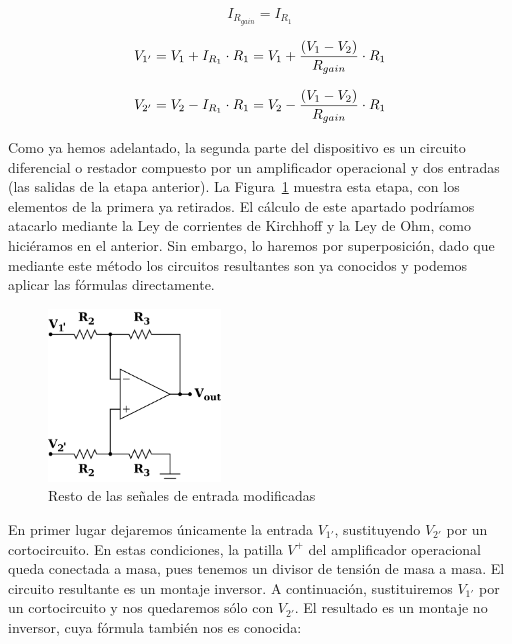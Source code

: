 \documentclass[a4paper,titlepage]{article}
\begin{document}
\begin{equation}
I_{R_{gain}} = I_{R_{1}}
\label{Corrientes}
\end{equation}

\begin{equation}
V_{1'} = V_1 + I_{R_{1}} \cdot R_1 = V_1 + {{(V_{1} - V_{2})} \over {R_{gain}}} \cdot {R_1}
\label{V1'}
\end{equation}

\begin{equation}
V_{2'} = V_2 - I_{R_{1}} \cdot R_1 = V_2 - {{(V_{1} - V_{2})} \over {R_{gain}}} \cdot {R_1}
\label{V2'}
\end{equation}

Como ya hemos adelantado, la segunda parte del dispositivo es un circuito diferencial o restador compuesto por un amplificador operacional y dos entradas (las salidas de la etapa anterior). La Figura~\ref{Parte2}
muestra esta etapa, con los elementos de la primera ya retirados. El cálculo de este apartado podríamos atacarlo mediante la Ley de corrientes de Kirchhoff y la Ley de Ohm, como hiciéramos en el anterior.
Sin embargo, lo haremos por superposición, dado que mediante este método los circuitos resultantes son ya conocidos y podemos aplicar las fórmulas directamente.

\begin{figure}[!h]
 \begin{center}
  \includegraphics[width=130pt]{./parte2.png}
  \caption{Resto de las señales de entrada modificadas}
  \label{Parte2}
 \end{center}
\end{figure}

En primer lugar dejaremos únicamente la entrada $V_{1'}$, sustituyendo $V_{2'}$ por un cortocircuito. En estas condiciones, la patilla $V^{+}$ del amplificador operacional queda conectada a masa, pues tenemos un divisor
de tensión de masa a masa. El circuito resultante es un montaje inversor. A continuación, sustituiremos $V_{1'}$ por un cortocircuito y nos quedaremos sólo con $V_{2'}$. El resultado es un montaje no inversor, cuya fórmula también nos es conocida:
\end{document}
